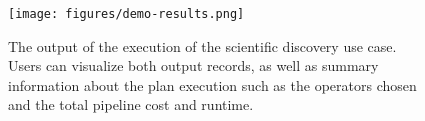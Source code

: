 
\begin{figure}[t]
    \centering
    \texttt{[image: figures/demo-results.png]}
    \caption{The output of the execution of the scientific discovery use case. Users can visualize both output records, as well as summary information about the plan execution such as the operators chosen and the total pipeline cost and runtime. 
    }
    \label{fig:demo-results}
\end{figure}




